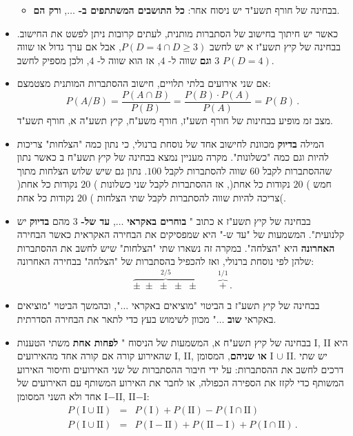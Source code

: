 \begin{itemize}
\begin{itemize}
\item
בבחינה של חורף תשע"ד יש ניסוח אחר:
\textbf{כל התושבים המשתתפים ב-} $\ldots$,
\textbf{ורק הם}.
\end{itemize}


\item
כאשר יש חיתוך בחישוב של הסתברות מותנית, לעתים קרובות ניתן לפשט את החישוב. בבחינה של קיץ תשע"ז א יש לחשב
$P(D=4\cap D\ge 3)$,
אבל אם ערך גדול או שווה
$3$
\textbf{וגם}
שווה ל-%
$4$,
אז הוא שווה ל-%
$4$, 
ולכן מספיק לחשב
$P(D=4)$.


\item
אם שני אירועים בלתי תלויים, חישוב ההסתברות המותנית מצטמצם:
\[
P(A/B) = \frac{P(A\cap B)}{P(B)} = \frac{P(B)\cdot P(A)}{P(A)}= P(B)\,.
\]
מצב זמ מופיע בבחינות של חורף תשע"ז, חורף משע"ח, קיץ תשע"ה א, חורף תשע"ד.

\item
המילה 
\textbf{בדיוק}
מכוונת לחישוב אחד של נוסחת ברנולי, כי נתון כמה "הצלחות" צריכות להיות וגם כמה "כשלונות". מקרה מעניין נמצא בבחינה של קיץ תשע"ח ב כאשר נתון שההסתברות לקבל 
$60$
שווה להסתברות לקבל
$100$.
נתון גם שיש שלוש הצלחות מתוך חמש )%
$20$
נקודות כל אחת(, אז ההסתברות לקבל שני כשלונות )%
$20$
נקודות כל אחת( צריכה להיות שווה להסתברות לקבל שתי הצלחות )%
$20$
נקודות כל אחת(.


\item
בבחינה של קיץ תשע"ז א כתוב "%
\textbf{בוחרים באקראי}
$\ldots$,
\textbf{עד של-}
$3$
מהם
\textbf{בדיוק}
יש קלנועית". המשמעות של "עד ש-" היא שמפסיקים את הבחירה האקראית כאשר הבחירה 
\textbf{האחרונה} 
היא "הצלחה". במקרה זה נשארו שתי "הצלחות" שיש לחשב את ההסתברות שלהן לפי נוסחת ברנולי, ואז להכפיל בהסתברות של "הצלחה" בבחירה האחרונה:
\[
\overbrace{\pm\;\pm\;\pm\;\pm\;\pm}^{2/5}\quad\quad \overbrace{+}^{1/1}\,.
\]


\item
בבחינה של קיץ תשע"ז ב הביטוי "מוציאים באקראי
$\ldots$",
ובהמשך הביטוי "מוציאים באקראי
\textbf{שוב}
$\ldots$"
מכוון לשימוש בעץ כדי לתאר את הבחירה הסדרתית.


\item
בבחינה של קיץ תשע"ח א, המשמעות של הניסוח "%
\textbf{לפחות אחת}
משתי הטענות I, II היא שהאירוע קורה אם קורה אחד מהאירועים I, II,
\textbf{או שניהם},
המסומן I
$\cup$
II.
יש שתי דרכים לחשב את ההסתברות: על ידי חיבור ההסתברות של שני האירועים וחיסור האירוע המשותף כדי לקזז את הספירה הכפולה, או לחבר את האירוע המשותף עם האירועים של אחד ולא השני המסומן 
I$-$II, II$-$I:
\begin{eqnarray*}
P(\textrm{I} \cup \textrm{II}) &=& P(\textrm{I}) + P(\textrm{II}) - P(\textrm{I} \cap \textrm{II})\\
P(\textrm{I} \cup \textrm{II}) &=& P(\textrm{I}-\textrm{II}) + P(\textrm{II}-\textrm{I}) + P(\textrm{I} \cap \textrm{II})\,.
\end{eqnarray*}


\end{itemize}
